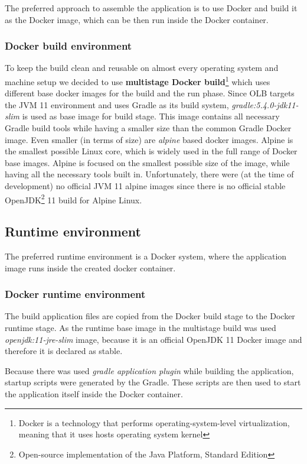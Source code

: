 The preferred approach to assemble the application is to use Docker
and build it as the Docker image, 
which can be then run inside the Docker container.

\subsubsection{Docker build environment}
To keep the build clean and reusable on almost every operating system and 
machine setup we decided to use 
\textbf{multistage Docker build}\footnote{Docker is a technology that performs operating-system-level virtualization,
meaning that it uses hosts operating system kernel}
which uses different base docker images for the build and the run phase.
Since OLB targets the JVM 11 environment and uses Gradle as its build system,
\textit{gradle:5.4.0-jdk11-slim} is used as base image for build stage.
This image contains all necessary Gradle build tools while having a smaller size than the common Gradle Docker image.
Even smaller (in terms of size) are \textit{alpine} based docker images. 
Alpine is the smallest possible Linux core, 
which is widely used in the full range of Docker base images.
Alpine is focused on the smallest possible size of the image, 
while having all the necessary tools built in.
Unfortunately, there were (at the time of development) no official JVM 11 alpine images
since there is no official stable OpenJDK\footnote{Open-source implementation of the Java Platform, Standard Edition} 
11 build for Alpine Linux.

\subsection{Runtime environment}
The preferred runtime environment is a Docker system, 
where the application image runs inside the created docker container.

\subsubsection{Docker runtime environment}\label{subsubsec:docker-runtime-env}
The build application files are copied from the Docker build stage to the Docker runtime stage.
As the runtime base image in the multistage build was used \textit{openjdk:11-jre-slim} image,
because it is an official OpenJDK 11 Docker image and therefore it is declared as stable.

Because there was used \textit{gradle application plugin} while building the application, 
startup scripts were generated by the Gradle.
These scripts are then used to start the application itself inside the Docker container.

